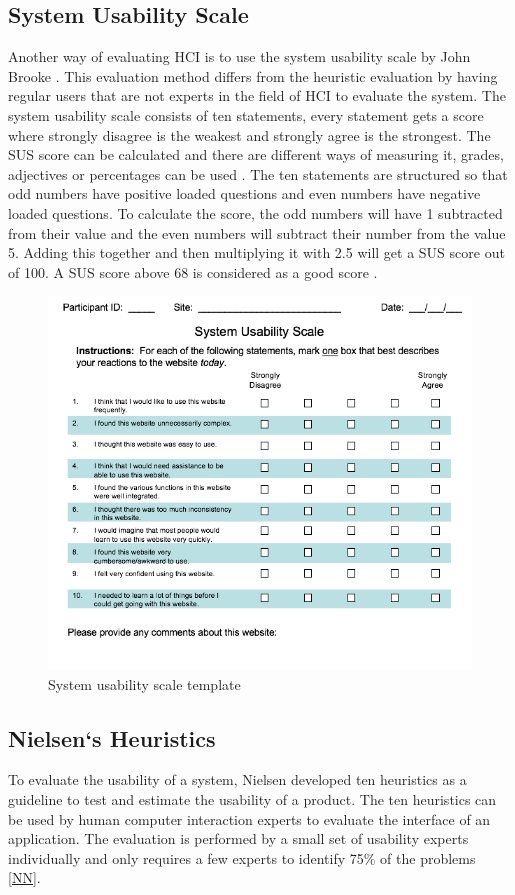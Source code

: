 \subsection{System Usability Scale}
Another way of evaluating HCI is to use the system usability scale by John Brooke \cite{Brooke}. This evaluation method differs from the heuristic evaluation by having regular users that are not experts in the field of HCI to evaluate the system. The system usability scale consists of ten statements, every statement gets a score where strongly disagree is the weakest and strongly agree is the strongest.
The SUS score can be calculated and there are different ways of measuring it, grades, adjectives or percentages can be used \cite{doi:10.1080/10447318.2018.1455307} . The ten statements are structured so that odd numbers have positive loaded questions and even numbers have negative loaded questions. To calculate the score, the odd numbers will have 1 subtracted from their value and the even numbers will subtract their number from the value 5. Adding this together and then multiplying it with 2.5 will get a SUS score out of 100. A SUS score above 68 is considered as a good score \cite{doi:10.1080/10447318.2018.1455307}. 
\begin{figure}[H]
    \centering
    \includegraphics[width=120mm]{figures/sus-template.png}
    \caption{System usability scale template}
\end{figure}


\subsection{Nielsen`s Heuristics}
To evaluate the usability of a system, Nielsen \cite{Nngroup} developed ten heuristics as a guideline to test and estimate the usability of a product. The ten heuristics can be used by human computer interaction experts to evaluate the interface of an application. The evaluation is performed by a small set of usability experts individually and only requires a few experts to identify 75\% of the problems \ref{NN}.


